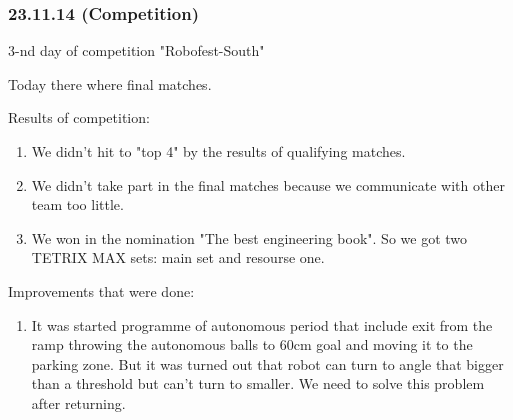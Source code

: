 \subsubsection{23.11.14 (Competition)}
\begin{center}
	 3-nd day of competition "Robofest-South"
\end{center}
Today there where final matches.

Results of competition:
\begin{enumerate}
	\item We didn't hit to "top 4" by the results of qualifying matches.
	
	\item We didn't take part in the final matches because we communicate with other team too little.
	
	\item We won in the nomination "The best engineering book". So we got two TETRIX MAX sets: main set and resourse one.
\end{enumerate}

Improvements that were done:
\begin{enumerate}
	\item It was started programme of autonomous period that include exit from the ramp throwing the autonomous balls to 60cm goal and moving it to the parking zone. But it was turned out that robot can turn to angle that bigger than a threshold but can't turn to smaller. We need to solve this problem after returning.
\end{enumerate}

